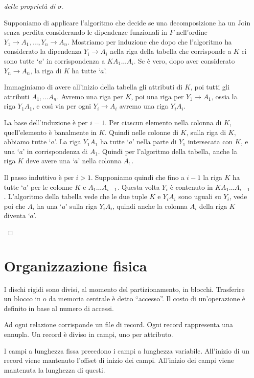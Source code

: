 \begin{proof}[delle propriet\`a di $\sigma$]
\begin{itemize}
    Supponiamo di applicare l'algoritmo che decide se una decomposizione ha un Join senza perdita considerando le dipendenze funzionali in $F$ nell'ordine $Y_1 \to A_1, \dots, Y_n \to A_n$. Mostriamo per induzione che dopo che l'algoritmo ha considerato la dipendenza $Y_i \to A_i$ nella riga della tabella che corrisponde a $K$ ci sono tutte `$a$' in corrispondenza a $K A_1 \dots A_i$. Se \`e vero, dopo aver considerato $Y_n \to A_n$, la riga di $K$ ha tutte `$a$'.

    Immaginiamo di avere all'inizio della tabella gli attributi di $K$, poi tutti gli attributi $A_1, \dots A_n$. Avremo una riga per $K$, poi una riga per $Y_1 \to A_1$, ossia la riga $Y_1 A_1$, e cos\`i via per ogni $Y_i \to A_i$ avremo una riga $Y_i A_i$.

    La base dell'induzione \`e per $i = 1$. Per ciascun elemento nella colonna di $K$, quell'elemento \`e banalmente in $K$. Quindi nelle colonne di $K$, sulla riga di $K$, abbiamo tutte `$a$'. La riga $Y_1 A_1$ ha tutte `$a$' nella parte di $Y_1$ intersecata con $K$, e una `$a$' in corrispondenza di $A_1$. Quindi per l'algoritmo della tabella, anche la riga $K$ deve avere una `$a$' nella colonna $A_1$.

    Il passo induttivo \`e per $i > 1$. Supponiamo quindi che fino a $i-1$ la riga $K$ ha tutte `$a$' per le colonne $K$ e $A_1 \dots A_{i - 1}$. Questa volta $Y_i$ \`e contenuto in $K A_1 \dots A_{i-1}$. L'algoritmo della tabella vede che le due tuple $K$ e $Y_i A_i$ sono uguali su $Y_i$, vede poi che $A_i$ ha una `$a$' sulla riga $Y_i A_i$, quindi anche la colonna $A_i$ della riga $K$ diventa `$a$'.
\end{itemize}
\end{proof}

\chapter{Organizzazione fisica}

I dischi rigidi sono divisi, al momento del partizionamento, in blocchi. Trasferire un blocco in o da memoria centrale \`e detto ``accesso''. Il costo di un'operazione \`e definito in base al numero di accessi.

Ad ogni relazione corrisponde un file di record. Ogni record rappresenta una ennupla. Un record \`e diviso in campi, uno per attributo.

I campi a lunghezza fissa precedono i campi a lunghezza variabile. All'inizio di un record viene mantenuto l'offset di inizio dei campi. All'inizio dei campi viene mantenuta la lunghezza di questi.

